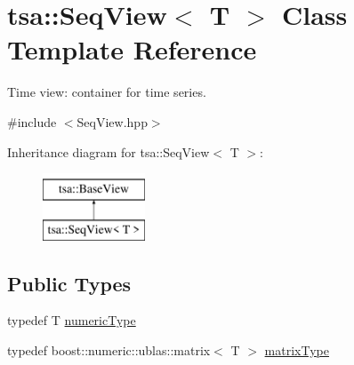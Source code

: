 \hypertarget{classtsa_1_1_seq_view}{}\section{tsa\+:\+:Seq\+View$<$ T $>$ Class Template Reference}
\label{classtsa_1_1_seq_view}


Time view\+: container for time series.  




{\ttfamily \#include $<$Seq\+View.\+hpp$>$}

Inheritance diagram for tsa\+:\+:Seq\+View$<$ T $>$\+:\begin{figure}[H]
\begin{center}
\leavevmode
\includegraphics[height=2.000000cm]{classtsa_1_1_seq_view}
\end{center}
\end{figure}
\subsection*{Public Types}
\begin{DoxyCompactItemize}
\item 
typedef T \hyperlink{classtsa_1_1_seq_view_a72b689db78d0feea3305e62cc3852a1d}{numeric\+Type}
\item 
typedef boost\+::numeric\+::ublas\+::matrix$<$ T $>$ \hyperlink{classtsa_1_1_seq_view_a2402583f29cfbb491586ab529be3e27f}{matrix\+Type}
\end{DoxyCompactItemize}
